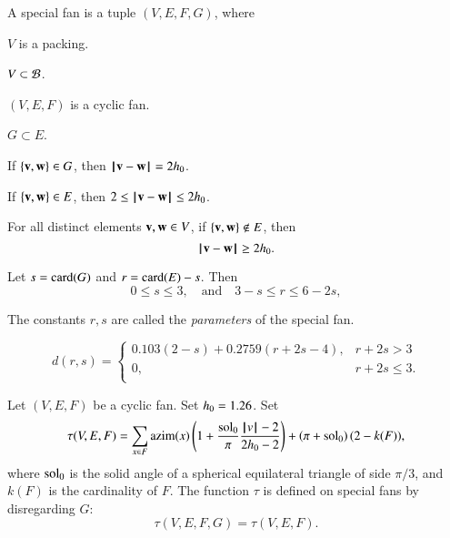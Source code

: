 \begin{definition}
A special fan is a tuple $(V,E,F,G)$, where
\begin{nomerate}
\item {} $V$ is a packing.
\item {} $V\subset {\mathcal B}$.
\item {} $(V,E,F)$ is a cyclic fan.
\item {} $G\subset E$.
\item {} If $\{{\mathbf v},{\mathbf w}\}\in G$, then ${\hskip0.1em|\hskip-0.15em|\hskip0.1em}{\mathbf v} - {\mathbf w}{\hskip0.1em|\hskip-0.15em|\hskip0.1em}=2{h_0}$.
\item {} If $\{{\mathbf v},{\mathbf w}\}\in E$, then $2\le {\hskip0.1em|\hskip-0.15em|\hskip0.1em}{\mathbf v} - {\mathbf w}{\hskip0.1em|\hskip-0.15em|\hskip0.1em}\le 2{h_0}$.
\item {} For all distinct elements ${\mathbf v},{\mathbf w}\in V$, if
$\{{\mathbf v},{\mathbf w}\}\not\in E$, then $${\hskip0.1em|\hskip-0.15em|\hskip0.1em}{\mathbf v} - {\mathbf w}{\hskip0.1em|\hskip-0.15em|\hskip0.1em}\ge 2{h_0}.$$
\item {} %
 Let      $s={\operatorname{card}}(G)$ and $r={\operatorname{card}}(E) - s$.  Then
$$0\le s \le 3,\quad\text{and}\quad3-s \le r \le 6 - 2s,$$
\end{nomerate}
The constants $r,s$ are called the {\it parameters} of the special fan.
\end{definition}



\begin{definition}[d]
$$d(r,s) = \begin{cases}
    0.103 (2-s) + 0.2759 (r+2s-4), & r + 2s > 3\\
    0, & r + 2s \le 3.\\
    \end{cases}$$
\end{definition}

\begin{definition}[$\hm$,~$\tau$]
Let $(V,E,F)$ be a cyclic fan.  Set ${h_0} = 1.26$.  Set
$$
\tau(V,E,F) =\sum_{x\in F} {\operatorname{azim}}(x)\left(1 + \frac{\displaystyle \operatorname{sol}_0}{\displaystyle \pi}  \frac{\displaystyle {{\hskip0.1em|\hskip-0.15em|\hskip0.1em}v{\hskip0.1em|\hskip-0.15em|\hskip0.1em}}-2}{\displaystyle 2{h_0}-2}\right) + \left(\pi+{\operatorname{sol}_0}\right) (2- k(F)),
$$
where  $\operatorname{sol}_0$ is the solid angle of a spherical equilateral triangle of side $\pi/3$, and $k(F)$ is the cardinality of $F$.
The function $\tau$ is defined on special fans by disregarding $G$:
$$
\tau(V,E,F,G) = \tau(V,E,F).
$$
\end{definition}




